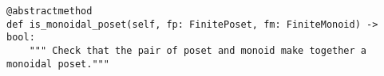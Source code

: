 \par\begin{minipage}{82ex}
\begin{verbatim}
@abstractmethod
def is_monoidal_poset(self, fp: FinitePoset, fm: FiniteMonoid) -> bool:
    """ Check that the pair of poset and monoid make together a monoidal poset."""
\end{verbatim}
\end{minipage}\par